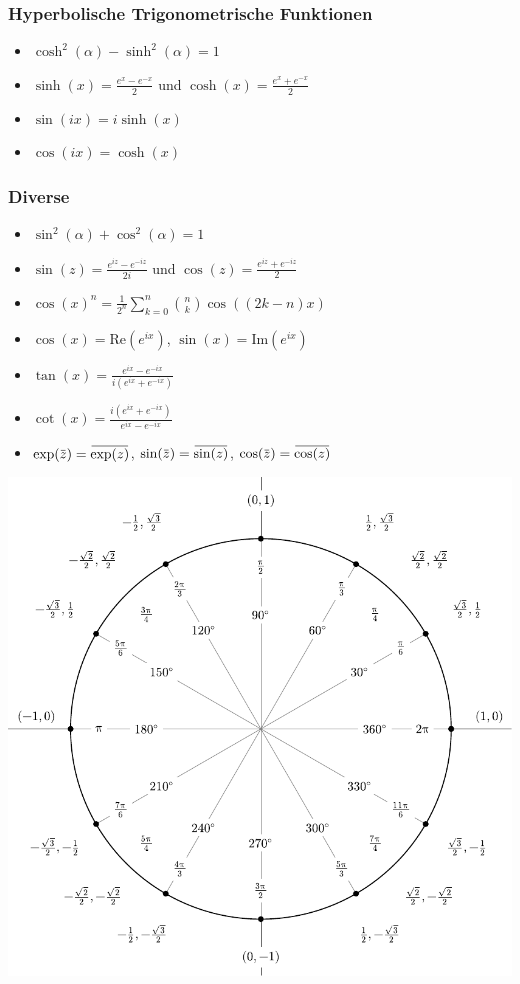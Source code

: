\documentclass[a4paper,10pt]{article}
\def\Re{\text{Re}}
\def\Im{\text{Im}}
\newcommand{\overbar}[1]{\mkern 1.5mu\overline{\mkern-1.5mu#1\mkern-1.5mu}\mkern 1.5mu}
\begin{document}
\subsubsection{Hyperbolische Trigonometrische Funktionen}
\begin{itemize}
  \item $\cosh^2(\alpha) - \sinh^2(\alpha) = 1$
  \item $\sinh(x) = \frac{e^x - e^{-x}}{2}$ und $\cosh(x) = \frac{e^x + e^{-x}}{2}$
  \item $\sin(ix) = i \sinh(x)$
  \item $\cos(ix) = \cosh(x)$
 \end{itemize}

\subsubsection{Diverse}

\begin{itemize}
 \item $\sin^2(\alpha) + \cos^2(\alpha) = 1$
 \item $\sin(z) = \frac{e^{iz} - e^{-iz}}{2i}$ und $\cos(z) = \frac{e^{iz} + e^{-iz}}{2}$
 \item $\cos(x)^n = \frac{1}{2^n} \sum_{k=0}^n {n \choose k} \cos((2k - n)x)$
 \item $\cos(x) = \Re(e^{ix})$, $\sin(x) = \Im(e^{ix})$
 \item $\tan(x) = \frac{e^{ix} - e^{-ix}}{i(e^{ix} + e^{-ix})}$
 \item $\cot(x) = \frac{i(e^{ix} + e^{-ix})}{e^{ix} - e^{-ix}}$
 \item $\exp(\overbar{z}) = \overbar{\exp(z)}$, $\sin(\overbar{z}) = \overbar{\sin(z)}$, $\cos(\overbar{z}) = \overbar{\cos(z)}$
\end{itemize}


\begin{center}
  \includegraphics[width= \linewidth]{include_degrees_circle.pdf}
\end{center}
\end{document}
